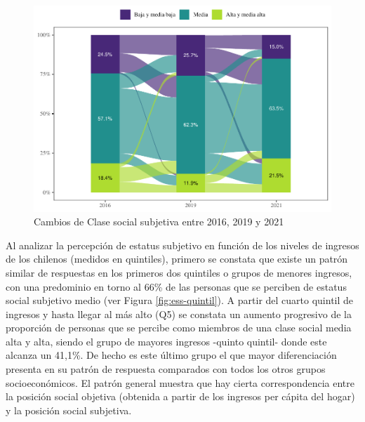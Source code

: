 \documentclass[
  12pt,
]{book}
\begin{document}
\begin{figure}

{\centering \includegraphics{reporte-elsoc_files/figure-latex/ess-cambio-1} 

}

\caption{Cambios de Clase social subjetiva entre 2016, 2019 y 2021}\label{fig:ess-cambio}
\end{figure}

Al analizar la percepción de estatus subjetivo en función de los niveles de ingresos de los chilenos (medidos en quintiles), primero se constata que existe un patrón similar de respuestas en los primeros dos quintiles o grupos de menores ingresos, con una predominio en torno al 66\% de las personas que se perciben de estatus social subjetivo medio (ver Figura \ref{fig:ess-quintil}). A partir del cuarto quintil de ingresos y hasta llegar al más alto (Q5) se constata un aumento progresivo de la proporción de personas que se percibe como miembros de una clase social media alta y alta, siendo el grupo de mayores ingresos -quinto quintil- donde este alcanza un 41,1\%. De hecho es este último grupo el que mayor diferenciación presenta en su patrón de respuesta comparados con todos los otros grupos socioeconómicos. El patrón general muestra que hay cierta correspondencia entre la posición social objetiva (obtenida a partir de los ingresos per cápita del hogar) y la posición social subjetiva.
\end{document}
